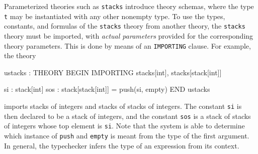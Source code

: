 Parameterized theories such as \texttt{stacks} introduce theory schemas,
where the type \texttt{t} may be instantiated with any other nonempty
type.  To use the types, constants, and formulas of the \texttt{stacks}
theory from another theory, the \texttt{stacks} theory must be imported,
with \emph{actual parameters} provided for the corresponding theory
parameters.  This is done by means of an \texttt{IMPORTING} clause. For
example, the theory
\begin{pvsex}
  ustacks : THEORY
    BEGIN
    IMPORTING stacks[int], stacks[stack[int]]

    si : stack[int]
    sos : stack[stack[int]] = push(si, empty)
    END ustacks
\end{pvsex}
imports stacks of integers and stacks of stacks of integers.  The constant
\texttt{si} is then declared to be a stack of integers, and the constant
\texttt{sos} is a stack of stacks of integers whose top element is
\texttt{si}.  Note that the system is able to determine which instance of
\texttt{push} and \texttt{empty} is meant from the type of the first
argument.  In general, the typechecker infers the type of an expression
from its context.  

